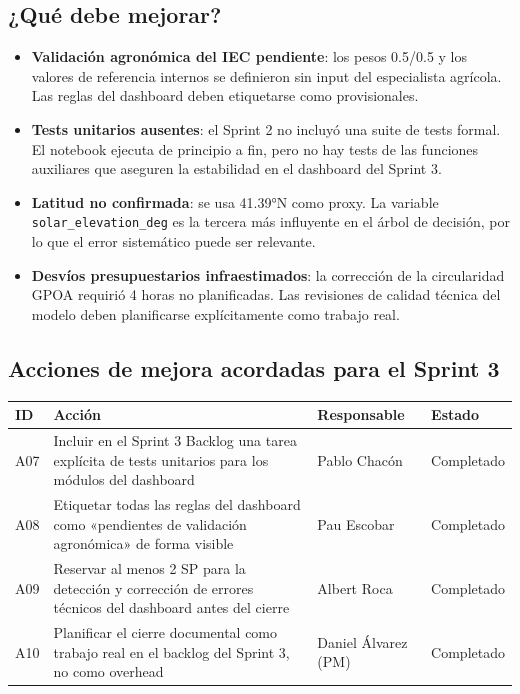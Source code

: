\documentclass[11pt,a4paper]{article}
\begin{document}
\subsection{¿Qué debe mejorar?}

\begin{itemize}
  \item \textbf{Validación agronómica del IEC pendiente}: los pesos 0.5/0.5 y los valores de
    referencia internos se definieron sin input del especialista agrícola. Las reglas del
    dashboard deben etiquetarse como provisionales.
  \item \textbf{Tests unitarios ausentes}: el Sprint 2 no incluyó una suite de tests formal. El
    notebook ejecuta de principio a fin, pero no hay tests de las funciones auxiliares que
    aseguren la estabilidad en el dashboard del Sprint 3.
  \item \textbf{Latitud no confirmada}: se usa 41.39°N como proxy. La variable
    \texttt{solar\_elevation\_deg} es la tercera más influyente en el árbol de decisión, por lo que
    el error sistemático puede ser relevante.
  \item \textbf{Desvíos presupuestarios infraestimados}: la corrección de la circularidad GPOA
    requirió 4 horas no planificadas. Las revisiones de calidad técnica del modelo deben
    planificarse explícitamente como trabajo real.
\end{itemize}

\subsection{Acciones de mejora acordadas para el Sprint 3}

\begin{longtable}{p{} p{} p{} p{}}
\textbf{ID} & \textbf{Acción} & \textbf{Responsable} & \textbf{Estado} \\
\hline
A07 & Incluir en el Sprint 3 Backlog una tarea explícita de tests unitarios para los módulos del dashboard & Pablo Chacón & Completado \\
A08 & Etiquetar todas las reglas del dashboard como «pendientes de validación agronómica» de forma visible & Pau Escobar & Completado \\
A09 & Reservar al menos 2 SP para la detección y corrección de errores técnicos del dashboard antes del cierre & Albert Roca & Completado \\
A10 & Planificar el cierre documental como trabajo real en el backlog del Sprint 3, no como overhead & Daniel Álvarez (PM) & Completado \\
\end{longtable}
\end{document}
